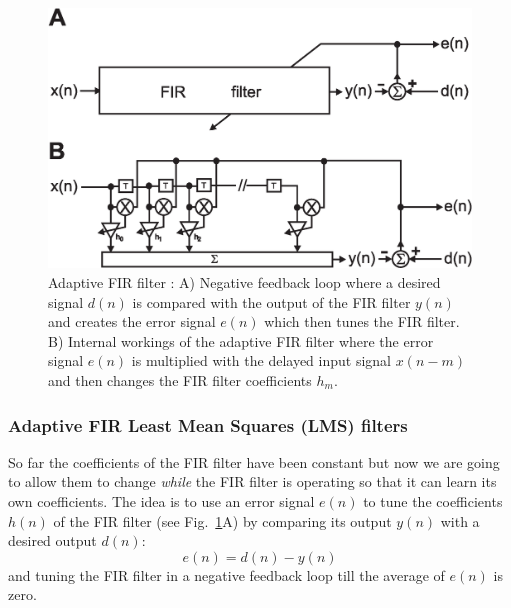 \documentclass[12pt,a4paper]{article}
\begin{document}
\begin{figure}[!hbt]
\begin{center}
\mbox{\includegraphics[width=\linewidth]{fir_lms}}
\caption{Adaptive FIR filter \label{fir_lms}: A) Negative feedback
  loop where a desired signal $d(n)$ is compared with the output
  of the FIR filter $y(n)$ and creates the error signal $e(n)$ which
  then tunes the FIR filter. B) Internal workings of the adaptive FIR
  filter where the error signal $e(n)$ is multiplied with the delayed input signal
  $x(n-m)$ and then changes the FIR filter coefficients $h_m$.}
\end{center}
\end{figure}



\subsubsection{Adaptive FIR Least Mean Squares (LMS) filters}
So far the coefficients of the FIR filter have been constant but now
we are going to allow them to change \textsl{while} the FIR filter is
operating so that it can learn its own coefficients. The
idea is to use an error signal $e(n)$ to tune the coefficients $h(n)$
of the FIR filter (see Fig.~\ref{fir_lms}A) by comparing its output
$y(n)$ with a desired output $d(n)$:
\begin{equation}
  e(n) = d(n) - y(n) \label{lmserror}
\end{equation}
and tuning the FIR filter in a negative feedback loop till the
average of $e(n)$ is zero.
\end{document}
